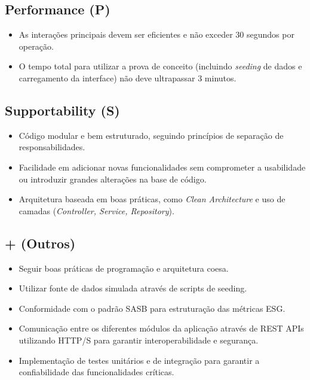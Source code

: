 \subsection{Performance (P)}
\begin{itemize}
    \item As interações principais devem ser eficientes e não exceder 30 segundos por operação.
    \item O tempo total para utilizar a prova de conceito (incluindo \textit{seeding} de dados e carregamento da interface) não deve ultrapassar 3 minutos.
\end{itemize}

\subsection{Supportability (S)}
\begin{itemize}
    \item Código modular e bem estruturado, seguindo princípios de separação de responsabilidades.
    \item Facilidade em adicionar novas funcionalidades sem comprometer a usabilidade ou introduzir grandes alterações na base de código.
    \item Arquitetura baseada em boas práticas, como \textit{Clean Architecture} e uso de camadas (\textit{Controller, Service, Repository}).
\end{itemize}

\subsection{+ (Outros)}
\begin{itemize}
    \item Seguir boas práticas de programação e arquitetura coesa.
    \item Utilizar fonte de dados simulada através de scripts de seeding.
    \item Conformidade com o padrão \gls{SASB} para estruturação das métricas \gls{ESG}.
    \item Comunicação entre os diferentes módulos da aplicação através de REST APIs utilizando HTTP/S para garantir interoperabilidade e segurança.
    \item Implementação de testes unitários e de integração para garantir a confiabilidade das funcionalidades críticas.
\end{itemize}


